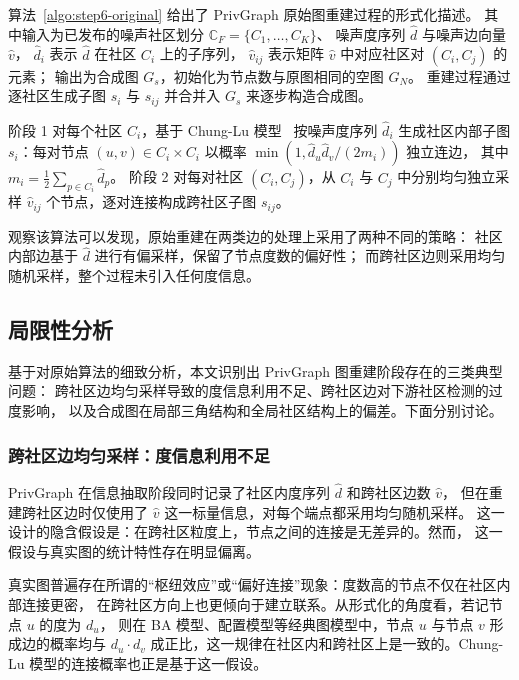 \par 算法~\ref{algo:step6-original} 给出了 PrivGraph 原始图重建过程的形式化描述。
其中输入为已发布的噪声社区划分 $\mathbb{C}_F = \{C_1, \ldots, C_K\}$、
噪声度序列 $\hat{d}$ 与噪声边向量 $\hat{v}$，
$\hat{d}_i$ 表示 $\hat{d}$ 在社区 $C_i$ 上的子序列，
$\hat{v}_{ij}$ 表示矩阵 $\hat{v}$ 中对应社区对 $(C_i, C_j)$ 的元素；
输出为合成图 $G_s$，初始化为节点数与原图相同的空图 $G_N$。
重建过程通过逐社区生成子图 $s_i$ 与 $s_{ij}$ 并合并入 $G_s$ 来逐步构造合成图。

\par 阶段 1 对每个社区 $C_i$，基于 Chung-Lu 模型~\cite{chung_connected_2002}
按噪声度序列 $\hat{d}_i$ 生成社区内部子图 $s_i$：每对节点 $(u, v) \in C_i \times C_i$
以概率 $\min(1, \hat{d}_u \hat{d}_v / (2 m_i))$ 独立连边，
其中 $m_i = \frac{1}{2}\sum_{p \in C_i} \hat{d}_p$。
阶段 2 对每对社区 $(C_i, C_j)$，从 $C_i$ 与 $C_j$ 中分别均匀独立采样
$\hat{v}_{ij}$ 个节点，逐对连接构成跨社区子图 $s_{ij}$。

\par 观察该算法可以发现，原始重建在两类边的处理上采用了两种不同的策略：
社区内部边基于 $\hat{d}$ 进行有偏采样，保留了节点度数的偏好性；
而跨社区边则采用均匀随机采样，整个过程未引入任何度信息。

\subsection{局限性分析}

\par 基于对原始算法的细致分析，本文识别出 PrivGraph 图重建阶段存在的三类典型问题：
跨社区边均匀采样导致的度信息利用不足、跨社区边对下游社区检测的过度影响，
以及合成图在局部三角结构和全局社区结构上的偏差。下面分别讨论。

\subsubsection{跨社区边均匀采样：度信息利用不足}
\label{subsubsec:cross-uniform}

\par PrivGraph 在信息抽取阶段同时记录了社区内度序列 $\hat{d}$ 和跨社区边数 $\hat{v}$，
但在重建跨社区边时仅使用了 $\hat{v}$ 这一标量信息，对每个端点都采用均匀随机采样。
这一设计的隐含假设是：在跨社区粒度上，节点之间的连接是无差异的。然而，
这一假设与真实图的统计特性存在明显偏离。

\par 真实图普遍存在所谓的``枢纽效应''或``偏好连接''现象：度数高的节点不仅在社区内部连接更密，
在跨社区方向上也更倾向于建立联系。从形式化的角度看，若记节点 $u$ 的度为 $d_u$，
则在 BA 模型、配置模型等经典图模型中，节点 $u$ 与节点 $v$ 形成边的概率均与 $d_u \cdot d_v$ 
成正比，这一规律在社区内和跨社区上是一致的。Chung-Lu 模型的连接概率也正是基于这一假设。

